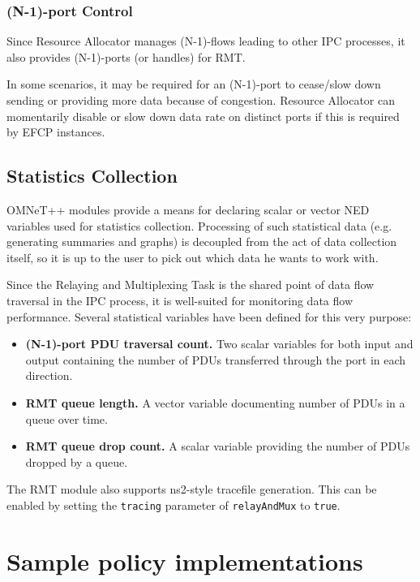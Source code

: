             \subsubsection{(N-1)-port Control}

                Since Resource Allocator manages (N-1)-flows leading to other IPC processes, it also provides (N-1)-ports (or handles) for RMT.

                In some scenarios, it may be required for an (N-1)-port to cease/slow down sending or providing more data because of congestion. Resource Allocator can momentarily disable or slow down data rate on distinct ports if this is required by EFCP instances.


        \subsection{Statistics Collection}

            OMNeT++ modules provide a means for declaring scalar or vector NED variables used for statistics collection. Processing of such statistical data (e.g. generating summaries and graphs) is decoupled from the act of data collection itself, so it is up to the user to pick out which data he wants to work with.

            Since the Relaying and Multiplexing Task is the shared point of data flow traversal in the IPC process, it is well-suited for monitoring data flow performance. Several statistical variables have been defined for this very purpose:

            \begin{itemize}
                \item \textbf{(N-1)-port PDU traversal count.} Two scalar variables for both input and output containing the number of PDUs transferred through the port in each direction.
                \item \textbf{RMT queue length.} A vector variable documenting number of PDUs in a queue over time.
                \item \textbf{RMT queue drop count.} A scalar variable providing the number of PDUs dropped by a queue.
            \end{itemize}

            The RMT module also supports ns2-style tracefile generation. This can be enabled by setting the \texttt{tracing} parameter of \texttt{relayAndMux} to \texttt{true}.

    \section{Sample policy implementations}\label{implementation:policies}

